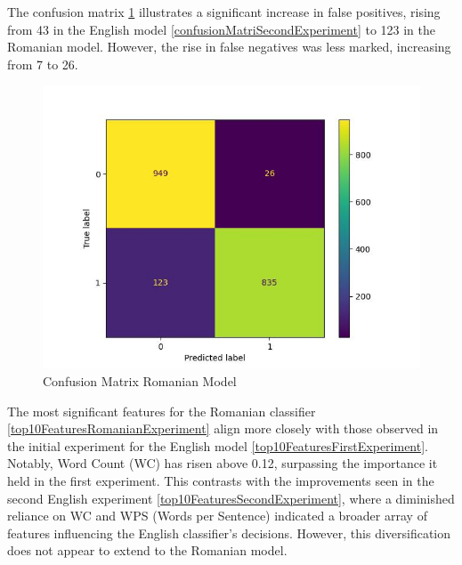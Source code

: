The confusion matrix \ref{confusionMatrixRomanianExperiment} illustrates a significant increase in false positives, rising from 43 in the English model \ref{confusionMatriSecondExperiment} to 123 in the Romanian model. However, the rise in false negatives was less marked, increasing from 7 to 26.

\begin{figure}[htbp]
	\centering
		\includegraphics[scale=0.8]{LaTeX Bachelor Thesis Depression Signs Detection/figures/metrics/experimentRomanian/confusionMatrix.jpg}
	\caption{Confusion Matrix Romanian Model}
	\label{confusionMatrixRomanianExperiment}
\end{figure}



The most significant features for the Romanian classifier \ref{top10FeaturesRomanianExperiment} align more closely with those observed in the initial experiment for the English model \ref{top10FeaturesFirstExperiment}. Notably, Word Count (WC) has risen above 0.12, surpassing the importance it held in the first experiment. This contrasts with the improvements seen in the second English experiment \ref{top10FeaturesSecondExperiment}, where a diminished reliance on WC and WPS (Words per Sentence) indicated a broader array of features influencing the English classifier’s decisions. However, this diversification does not appear to extend to the Romanian model.

